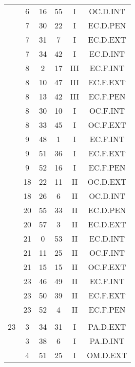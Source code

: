 \documentclass[12pt, a4paper]{article}
\begin{document}
\begin{multicols}{3}
{\begin{tabular}{c c c c c c}
	 	 	 	 & 6 & 16 & 55 & I & OC.D.INT\\%
	 	 	 	 & 7 & 30 & 22 & I & EC.D.PEN\\%
	 	 	 	 & 7 & 31 & 7 & I & EC.D.EXT\\%
	 	 	 	 & 7 & 34 & 42 & I & EC.D.INT\\%
	 	 	 	 & 8 & 2 & 17 & III & EC.F.INT\\%
	 	 	 	 & 8 & 10 & 47 & III & EC.F.EXT\\%
	 	 	 	 & 8 & 13 & 42 & III & EC.F.PEN\\%
	 	 	 	 & 8 & 30 & 10 & I & OC.F.INT\\%
	 	 	 	 & 8 & 33 & 45 & I & OC.F.EXT\\%
	 	 	 	 & 9 & 48 & 1 & I & EC.F.INT\\%
	 	 	 	 & 9 & 51 & 36 & I & EC.F.EXT\\%
	 	 	 	 & 9 & 52 & 16 & I & EC.F.PEN\\%
	 	 	 	 & 18 & 22 & 11 & II & OC.D.EXT\\%
	 	 	 	 & 18 & 26 & 6 & II & OC.D.INT\\%
	 	 	 	 & 20 & 55 & 33 & II & EC.D.PEN\\%
	 	 	 	 & 20 & 57 & 3 & II & EC.D.EXT\\%
	 	 	 	 & 21 & 0 & 53 & II & EC.D.INT\\%
	 	 	 	 & 21 & 11 & 25 & II & OC.F.INT\\%
	 	 	 	 & 21 & 15 & 15 & II & OC.F.EXT\\%
	 	 	 	 & 23 & 46 & 49 & II & EC.F.INT\\%
	 	 	 	 & 23 & 50 & 39 & II & EC.F.EXT\\%
	 	 	 	 & 23 & 52 & 4 & II & EC.F.PEN\\%
	 	 	 	 & & & & & \\%
	 	 	 	23 & 3 & 34 & 31 & I & PA.D.EXT\\%
	 	 	 	 & 3 & 38 & 6 & I & PA.D.INT\\%
	 	 	 	 & 4 & 51 & 25 & I & OM.D.EXT\\%
	 	 \end{tabular}
 	}
\end{multicols}
\end{document}

